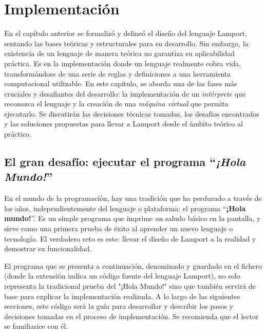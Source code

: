\chapter{\textbf{Implementación}}

En el capítulo anterior se formalizó y delineó el diseño del lenguaje Lamport, sentando las bases teóricas y estructurales para su desarrollo. Sin embargo, la existencia de un lenguaje de manera teórica no garantiza su aplicabilidad práctica. Es en la implementación donde un lenguaje realmente cobra vida, transformándose de una serie de reglas y definiciones a una herramienta computacional utilizable. En este capítulo, se aborda una de las fases más cruciales y desafiantes del desarrollo: la implementación de un \textit{intérprete} que reconozca el lenguaje y la creación de una \textit{máquina virtual} que permita ejecutarlo. Se discutirán las decisiones técnicas tomadas, los desafíos encontrados y las soluciones propuestas para llevar a Lamport desde el ámbito teórico al práctico.

\section{El gran desafío: ejecutar el programa ``\textit{¡Hola Mundo!}''}
En el mundo de la programación, hay una tradición que ha perdurado a través de los años, independientemente del lenguaje o plataforma: el programa ``\textbf{¡Hola mundo!}''. Es un simple programa que imprime un saludo básico en la pantalla, y sirve como una primera prueba de éxito al aprender un nuevo lenguaje o tecnología. El verdadero reto es este: llevar el diseño de Lamport a la realidad y demostrar su funcionalidad.




El programa que se presenta a continuación, denominado  y guardado en el fichero  (donde la extensión  indica un código fuente del lenguaje Lamport), no solo representa la tradicional prueba del "¡Hola Mundo!" sino que también servirá de base para explicar la implementación realizada. A lo largo de las siguientes secciones, este código será la guía para desarrollar y describir los pasos y decisiones tomadas en el proceso de implementación. Se recomienda que el lector se familiarice con él.

\newpage

